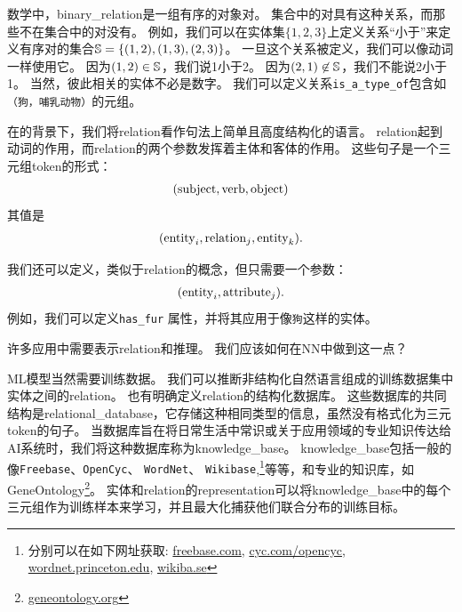 数学中，\gls{binary_relation}是一组有序的对象对。
集合中的对具有这种关系，而那些不在集合中的对没有。
例如，我们可以在实体集$\{ 1, 2, 3 \}$上定义关系``小于''来定义有序对的集合$\mathbb{S} = \{ (1, 2), (1, 3), (2, 3) \}$。
一旦这个关系被定义，我们可以像动词一样使用它。
因为$(1, 2) \in \mathbb{S}$，我们说1小于2。
因为$(2, 1) \not \in \mathbb{S}$，我们不能说2小于1。
当然，彼此相关的实体不必是数字。
我们可以定义关系{\tt is\_a\_type\_of}包含如{\tt（狗，哺乳动物）}的元组。

在的背景下，我们将\gls{relation}看作句法上简单且高度结构化的语言。
\gls{relation}起到动词的作用，而\gls{relation}的两个参数发挥着主体和客体的作用。
这些句子是一个三元组\gls{token}的形式：
\begin{align}
({\rm subject}, {\rm verb}, {\rm object})
\end{align}
其值是
\begin{align}
  ({\rm entity}_i, {\rm relation}_j, {\rm entity}_k).
\end{align}

我们还可以定义，类似于\gls{relation}的概念，但只需要一个参数：
\begin{align}
  ( {\rm entity}_i, {\rm attribute}_j ).
\end{align}
例如，我们可以定义{\tt has\_fur} 属性，并将其应用于像{\tt 狗}这样的实体。

许多应用中需要表示\gls{relation}和推理。
我们应该如何在\gls{NN}中做到这一点？

\gls{ML}模型当然需要训练数据。
我们可以推断非结构化自然语言组成的训练数据集中实体之间的\gls{relation}。
也有明确定义\gls{relation}的结构化数据库。 
这些数据库的共同结构是\gls{relational_database}，它存储这种相同类型的信息，虽然没有格式化为三元\gls{token}的句子。
当数据库旨在将日常生活中常识或关于应用领域的专业知识传达给\gls{AI}系统时，我们将这种数据库称为\gls{knowledge_base}。
\gls{knowledge_base}包括一般的像{\tt Freebase}、{\tt OpenCyc}、 {\tt WordNet}、 {\tt Wikibase},\footnote{分别可以在如下网址获取: \url{freebase.com}, \url{cyc.com/opencyc},
\url{wordnet.princeton.edu}, \url{wikiba.se}}等等，和专业的知识库，如GeneOntology\footnote{\url{geneontology.org}}。
实体和\gls{relation}的\gls{representation}可以将\gls{knowledge_base}中的每个三元组作为训练样本来学习，并且最大化捕获他们联合分布的训练目标\citep{Bordes-et-al-LSML2013}。

